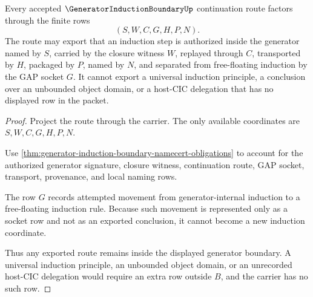 \begin{theorem}
\label{thm:generator-induction-boundary-gap-non-escape}
Every accepted $\GeneratorInductionBoundaryUp$ continuation route factors through the finite rows
$$
(S,W,C,G,H,P,N).
$$
The route may export that an induction step is authorized inside the generator named by $S$, carried by the closure witness $W$, replayed through $C$, transported by $H$, packaged by $P$, named by $N$, and separated from free-floating induction by the GAP socket $G$. It cannot export a universal induction principle, a conclusion over an unbounded object domain, or a host-CIC delegation that has no displayed row in the packet.
\end{theorem}
\begin{proof}
Project the route through the carrier. The only available coordinates are $S,W,C,G,H,P,N$.

Use \autoref{thm:generator-induction-boundary-namecert-obligations} to account for the authorized generator signature, closure witness, continuation route, GAP socket, transport, provenance, and local naming rows.

The row $G$ records attempted movement from generator-internal induction to a free-floating induction rule. Because such movement is represented only as a socket row and not as an exported conclusion, it cannot become a new induction coordinate.

Thus any exported route remains inside the displayed generator boundary. A universal induction principle, an unbounded object domain, or an unrecorded host-CIC delegation would require an extra row outside $B$, and the carrier has no such row.
\end{proof}

